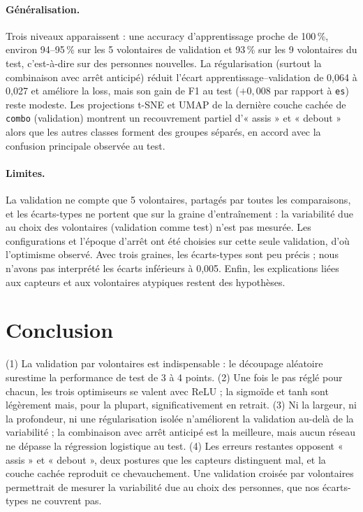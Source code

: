 \documentclass[10pt,a4paper]{article}
\begin{document}
\paragraph{Généralisation.} Trois niveaux apparaissent : une accuracy d'apprentissage proche de 100\,\%,
environ 94--95\,\% sur les 5 volontaires de validation et 93\,\% sur les 9 volontaires du test, c'est-à-dire sur
des personnes nouvelles. La régularisation (surtout la combinaison avec arrêt anticipé) réduit l'écart
apprentissage--validation de 0,064 à 0,027 et améliore la loss, mais son gain de F1 au test
($+0{,}008$ par rapport à \texttt{es}) reste modeste. Les projections t-SNE et UMAP de la dernière couche cachée
de \texttt{combo} (validation) montrent un recouvrement partiel d'« assis » et « debout » alors que les autres
classes forment des groupes séparés, en accord avec la confusion principale observée au test.

\paragraph{Limites.} La validation ne compte que 5 volontaires, partagés par toutes les comparaisons, et les
écarts-types ne portent que sur la graine d'entraînement : la variabilité due au choix des volontaires (validation
comme test) n'est pas mesurée. Les configurations et l'époque d'arrêt ont été choisies sur cette seule validation,
d'où l'optimisme observé. Avec trois graines, les écarts-types sont peu précis ; nous n'avons pas interprété les
écarts inférieurs à 0,005. Enfin, les explications liées aux capteurs et aux volontaires atypiques restent des
hypothèses.

\section{Conclusion}                  %
(1) La validation par volontaires est indispensable : le découpage aléatoire surestime la performance de test de 3 à
4 points. (2) Une fois le pas réglé pour chacun, les trois optimiseurs se valent avec ReLU ; la sigmoïde et tanh sont
légèrement mais, pour la plupart, significativement en retrait. (3) Ni la largeur, ni la profondeur, ni une régularisation isolée
n'améliorent la validation au-delà de la variabilité ; la combinaison avec arrêt anticipé est la meilleure, mais
aucun réseau ne dépasse la régression logistique au test. (4) Les erreurs restantes opposent « assis » et « debout »,
deux postures que les capteurs distinguent mal, et la couche cachée reproduit ce chevauchement. Une validation croisée
par volontaires permettrait de mesurer la variabilité due au choix des personnes, que nos écarts-types ne couvrent pas.
\end{document}
